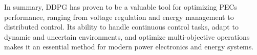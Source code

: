 



In summary, DDPG has proven to be a valuable tool for optimizing PECs performance, ranging from voltage regulation and energy management to distributed control. Its ability to handle continuous control tasks, adapt to dynamic and uncertain environments, and optimize multi-objective operations makes it an essential method for modern power electronics and energy systems.


